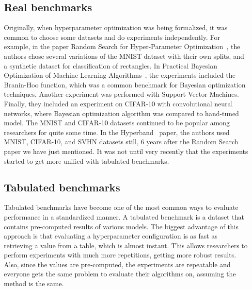 \subsection{Real benchmarks}
Originally, when hyperparameter optimization was being formalized, it was common to choose some datasets and do experiments independently. For example, in the paper Random Search for Hyper-Parameter Optimization~\cite{bergstra2012random}, the authors chose several variations of the MNIST dataset with their own splits, and a synthetic dataset for classification of rectangles. In Practical Bayesian Optimization of Machine Learning Algorithms~\cite{snoek2012practical}, the experiments included the Branin-Hoo function, which was a common benchmark for Bayesian optimization techniques. Another experiment was performed with Support Vector Machines. Finally, they included an experiment on CIFAR-10 with convolutional neural networks, where Bayesian optimization algorithm was compared to hand-tuned model. The MNIST and CIFAR-10 datasets continued to be popular among researchers for quite some time. In the Hyperband~\cite{li2018hyperband} paper, the authors used MNIST, CIFAR-10, and SVHN datasets still, 6 years after the Random Search paper we have just mentioned. It was not until very recently that the experiments started to get more unified with tabulated benchmarks.

\subsection{Tabulated benchmarks}

Tabulated benchmarks have become one of the most common ways to evaluate performance in a standardized manner. A tabulated benchmark is a dataset that contains pre-computed results of various models. The biggest advantage of this approach is that evaluating a hyperparameter configuration is as fast as retrieving a value from a table, which is almost instant. This allows researchers to perform experiments with much more repetitions, getting more robust results. Also, since the values are pre-computed, the experiments are repeatable and everyone gets the same problem to evaluate their algorithms on, assuming the method is the same.

